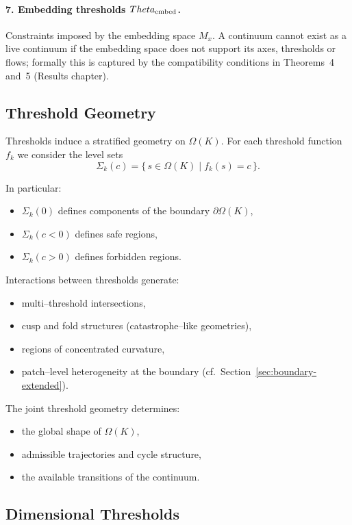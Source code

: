 \paragraph{7. Embedding thresholds \(\Theta_{\rm embed}\).}
Constraints imposed by the embedding space \(M_x\).
A continuum cannot exist as a live continuum if the embedding space does not
support its axes, thresholds or flows; formally this is captured by the
compatibility conditions in Theorems~4 and~5 (Results chapter).

\subsection{Threshold Geometry}

Thresholds induce a stratified geometry on \(\Omega(K)\).
For each threshold function \(f_k\) we consider the level sets
\[
  \Sigma_k(c) = \{\, s \in \Omega(K) \mid f_k(s) = c \,\}.
\]

In particular:
\begin{itemize}
    \item \(\Sigma_k(0)\) defines components of the boundary \(\partial\Omega(K)\),
    \item \(\Sigma_k(c<0)\) defines safe regions,
    \item \(\Sigma_k(c>0)\) defines forbidden regions.
\end{itemize}

Interactions between thresholds generate:
\begin{itemize}
    \item multi–threshold intersections,
    \item cusp and fold structures (catastrophe–like geometries),
    \item regions of concentrated curvature,
    \item patch–level heterogeneity at the boundary
          (cf.~Section~\ref{sec:boundary-extended}).
\end{itemize}

The joint threshold geometry determines:
\begin{itemize}
    \item the global shape of \(\Omega(K)\),
    \item admissible trajectories and cycle structure,
    \item the available transitions of the continuum.
\end{itemize}

\subsection{Dimensional Thresholds}

